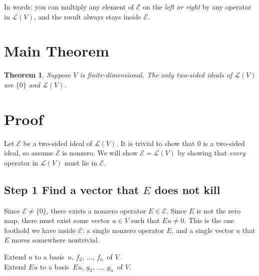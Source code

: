 \documentclass[12pt]{article}
\theoremstyle{mythmstyle}
\newtheorem{theorem}{Theorem}
\begin{document}
\vspace{4pt}

In words: you can multiply any element of $\mathcal{E}$ on the \emph{left or
right} by any operator in $\mathcal{L}(V)$, and the result always stays
inside $\mathcal{E}$.

\section{Main Theorem}

\begin{theorem}
Suppose $V$ is finite-dimensional. The only two-sided ideals of
$\mathcal{L}(V)$ are $\{0\}$ and $\mathcal{L}(V)$.
\end{theorem}

\section{Proof}

Let $\mathcal{E}$ be a two-sided ideal of $\mathcal{L}(V)$. It is trivial to show that ${0}$ is a two-sided ideal, so assume $\mathcal{E}$ is nonzero.
We will show $\mathcal{E} = \mathcal{L}(V)$ by showing that \emph{every}
operator in $\mathcal{L}(V)$ must lie in $\mathcal{E}$.

\subsection{Step 1 \quad Find a vector that $E$ does not kill}

Since $\mathcal{E} \neq \{0\}$, there exists a nonzero operator
$E \in \mathcal{E}$. Since $E$ is not the zero map, there must exist some
vector $u \in V$ such that $Eu \neq 0$. This is the one foothold we have
inside $\mathcal{E}$: a single nonzero operator $E$, and a single vector
$u$ that $E$ moves somewhere nontrivial.

\vspace{6pt}

Extend $u$ to a basis $\,u,\, f_2,\, \ldots,\, f_n\,$ of $V$.\\
Extend $Eu$ to a basis $\,Eu,\, g_2,\, \ldots,\, g_n\,$ of $V$.
\end{document}
